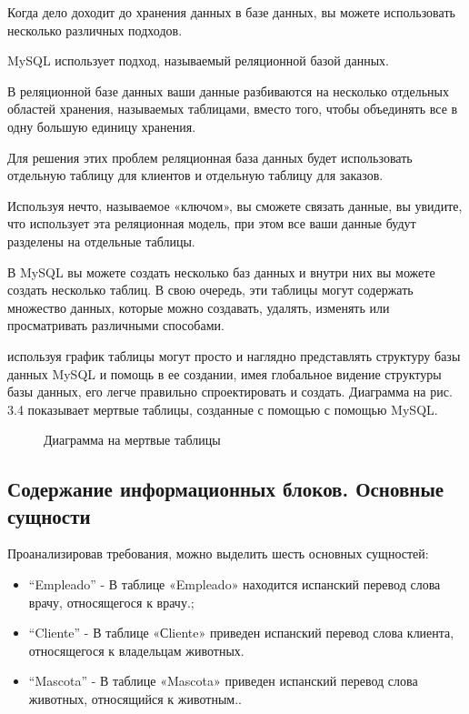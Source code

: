 Когда дело доходит до хранения данных в базе данных, вы можете использовать несколько различных подходов.

MySQL использует подход, называемый реляционной базой данных.

В реляционной базе данных ваши данные разбиваются на несколько отдельных областей хранения, называемых таблицами, вместо того, чтобы объединять все в одну большую единицу хранения.

Для решения этих проблем реляционная база данных будет использовать отдельную таблицу для клиентов и отдельную таблицу для заказов.

Используя нечто, называемое «ключом», вы сможете связать данные, вы увидите, что использует эта реляционная модель, при этом все ваши данные будут разделены на отдельные таблицы.

В MySQL вы можете создать несколько баз данных и внутри них вы можете создать несколько таблиц. В свою очередь, эти таблицы могут содержать множество данных, которые можно создавать, удалять, изменять или просматривать различными способами.

используя график таблицы могут просто и наглядно представлять структуру базы данных MySQL и помощь в ее создании, имея глобальное видение структуры базы данных,
его легче правильно спроектировать и создать.
Диаграмма на рис. 3.4 показывает мертвые таблицы, созданные с помощью с помощью MySQL.

\begin{figure}[H]
	\caption{Диаграмма на мертвые таблицы}
	\label{data:image}
\end{figure}


\subsection{Содержание информационных блоков. Основные сущности}

Проанализировав требования, можно выделить шесть основных сущностей:
\begin{itemize}
\item ``Empleado'' - В таблице «Empleado» находится испанский перевод слова врачу, относящегося к врачу.;
\item ``Cliente'' - В таблице «Сliente» приведен испанский перевод слова клиента, относящегося к владельцам животных.
\item ``Mascota'' - В таблице «Mascota» приведен испанский перевод слова животных, относящийся к животным..
\end{itemize}

